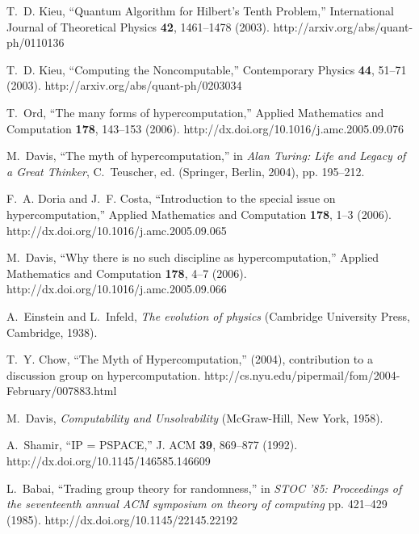 \documentclass[12pt]{article}
\begin{document}
\begin{thebibliography}{10}
T.~D. Kieu, \enquote{Quantum Algorithm for {H}ilbert's Tenth Problem,}
  International Journal of Theoretical Physics {\bf 42}, 1461--1478 (2003).
\newline http://arxiv.org/abs/quant-ph/0110136

T.~D. Kieu, \enquote{Computing the Noncomputable,} Contemporary Physics {\bf
  44}, 51--71 (2003).
\newline http://arxiv.org/abs/quant-ph/0203034

T.~Ord, \enquote{The many forms of hypercomputation,} Applied Mathematics and
  Computation {\bf 178}, 143--153 (2006).
\newline http://dx.doi.org/10.1016/j.amc.2005.09.076

M.~Davis, \enquote{The myth of hypercomputation,} in {\em Alan Turing: Life and
  Legacy of a Great Thinker\/}, C.~Teuscher, ed.  (Springer, Berlin, 2004), pp.
  195--212.

F.~A. Doria and J.~F. Costa, \enquote{Introduction to the special issue on
  hypercomputation,} Applied Mathematics and Computation {\bf 178}, 1--3
  (2006).
\newline http://dx.doi.org/10.1016/j.amc.2005.09.065

M.~Davis, \enquote{Why there is no such discipline as hypercomputation,}
  Applied Mathematics and Computation {\bf 178}, 4--7 (2006).
\newline http://dx.doi.org/10.1016/j.amc.2005.09.066

A.~Einstein and L.~Infeld, {\em The evolution of physics\/} (Cambridge
  University Press, Cambridge, 1938).

T.~Y. Chow, \enquote{The Myth of Hypercomputation,}  (2004), contribution to a
  discussion group on hypercomputation.
\newline http://cs.nyu.edu/pipermail/fom/2004-February/007883.html

M.~Davis, {\em Computability and Unsolvability\/} (McGraw-Hill, New York,
  1958).

A.~Shamir, \enquote{IP = PSPACE,} J. ACM {\bf 39}, 869--877 (1992).
\newline http://dx.doi.org/10.1145/146585.146609

L.~Babai, \enquote{Trading group theory for randomness,} in {\em STOC '85:
  Proceedings of the seventeenth annual ACM symposium on theory of computing\/}
   pp. 421--429 (1985).
\newline http://dx.doi.org/10.1145/22145.22192


\end{thebibliography}
\end{document}
